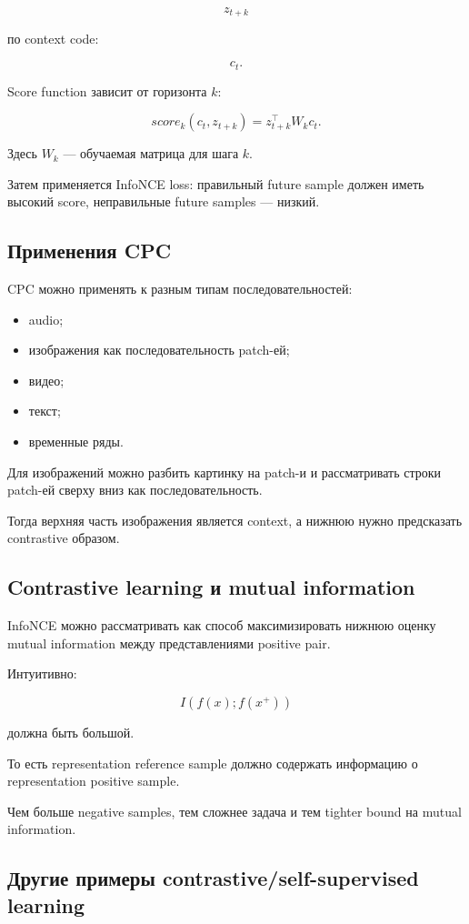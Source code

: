 \documentclass[a4paper,12pt]{article}
\begin{document}
\[
z_{t+k}
\]

по context code:

\[
c_t.
\]

Score function зависит от горизонта \(k\):

\[
score_k(c_t, z_{t+k})
=
z_{t+k}^{\top} W_k c_t.
\]

Здесь \(W_k\) --- обучаемая матрица для шага \(k\).

Затем применяется InfoNCE loss: правильный future sample должен иметь высокий score, неправильные future samples --- низкий.

\subsection{Применения CPC}

CPC можно применять к разным типам последовательностей:

\begin{itemize}
    \item audio;
    \item изображения как последовательность patch-ей;
    \item видео;
    \item текст;
    \item временные ряды.
\end{itemize}

Для изображений можно разбить картинку на patch-и и рассматривать строки patch-ей сверху вниз как последовательность.

Тогда верхняя часть изображения является context, а нижнюю нужно предсказать contrastive образом.

\subsection{Contrastive learning и mutual information}

InfoNCE можно рассматривать как способ максимизировать нижнюю оценку mutual information между представлениями positive pair.

Интуитивно:

\[
I(f(x); f(x^+))
\]

должна быть большой.

То есть representation reference sample должно содержать информацию о representation positive sample.

Чем больше negative samples, тем сложнее задача и тем tighter bound на mutual information.

\subsection{Другие примеры contrastive/self-supervised learning}
\end{document}
